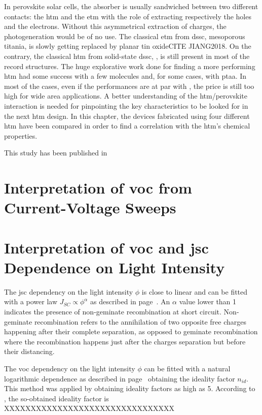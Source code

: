
 In perovskite solar cells, the absorber is usually sandwiched between two different contacts: the \gls{htm} and the \gls{etm} with the role of extracting respectively the holes and the electrons. Without this asymmetrical extraction of charges, the photogeneration would be of no use. The classical \gls{etm} from \gls{dssc}, mesoporous titania, is slowly getting replaced by planar tin oxideCITE JIANG2018. On the contrary, the classical \gls{htm} from solid-state \gls{dssc}, \spiro, is still present in most of the record structures. The huge explorative work done for finding a more performing \gls{htm} had some success with a few molecules and, for some cases, with \gls{ptaa}. In most of the cases, even if the performances are at par with \spiro, the price is still too high for wide area applications. A better understanding of the \gls{htm}/perovskite interaction is needed for pinpointing the key characteristics to be looked for in the next \gls{htm} design. In this chapter, the devices fabricated using four different \gls{htm} have been compared in order to find a correlation with the \gls{htm}'s chemical properties.

 This study has been published in %


\section{Interpretation of \gls{voc} from Current-Voltage Sweeps}


\section{Interpretation of \gls{voc} and \gls{jsc} Dependence on Light Intensity}\label{interpretation_lightintensity}

The \gls{jsc} dependency on the light intensity $\phi$ is close to linear and can be fitted with a power law $J_{SC} \propto \phi^\alpha$ as described in page~\pageref{methods_jsc_intensity}. An $\alpha$ value lower than 1 indicates the presence of non-geminate recombination at short circuit\cite{Credgington2011}. Non-geminate recombination refers to the annihilation of two opposite free charges happening after their complete separation, as opposed to geminate recombination where the recombination happens just after the charges separation but before their distancing.


The \gls{voc} dependency on the light intensity $\phi$ can be fitted with a natural logarithmic dependence as described in page~\pageref{methods_voc_intensity} obtaining the ideality factor $n_{id}$. This method was applied by  obtaining ideality factors as high as 5. According to , the so-obtained ideality factor is XXXXXXXXXXXXXXXXXXXXXXXXXXXXXXXX


